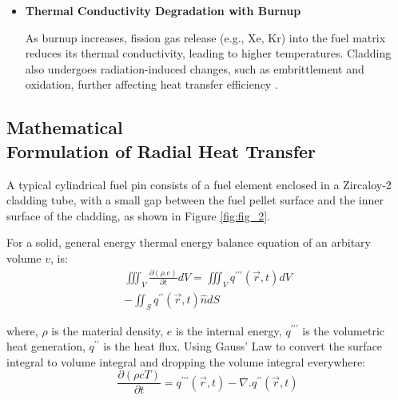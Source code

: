 \documentclass[12pt]{article}
\begin{document}
\begin{multicols}{2}
\begin{itemize}[leftmargin=0pt]
    \item[] \textbf{Thermal Conductivity Degradation with Burnup}

    As burnup increases, fission gas release (e.g., Xe, Kr) into the fuel matrix reduces its thermal conductivity, leading to higher temperatures. Cladding also undergoes radiation-induced changes, such as embrittlement and oxidation, further affecting heat transfer efficiency \cite{osti_1035151}.

\end{itemize}

\end{multicols}

\begin{multicols}{2}

\section{Mathematical \\ Formulation of Radial Heat Transfer}

A typical cylindrical fuel pin consists of a fuel element enclosed in a Zircaloy-2 cladding tube, with a small gap between the fuel pellet surface and the inner surface of the cladding, as shown in Figure \ref{fig:fig_2}.

For a solid, general energy thermal energy balance equation of an arbitary volume $v$, is:
\begin{equation}\label{eq:1}
    \begin{split}
            \iiint_V \frac{\partial(\rho.e)}{\partial t}dV = \iiint_V q^{\prime \prime \prime} \left({\vec{r}},t\right)d V \\ - \iint_S q^{\prime \prime} \left({\vec{r}},t\right) \hat{n}dS
    \end{split}
\end{equation}

where, $\rho$ is the material density, $e$ is the internal energy, $q^{\prime \prime \prime}$ is the volumetric heat generation, $q^{\prime \prime}$ is the heat flux. Using Gauss' Law to convert the surface integral to volume integral and dropping the volume integral everywhere: 
\begin{equation}\label{eq:2}
    \frac{\partial (\rho cT)}{\partial t} = q^{\prime \prime \prime} \left({\vec{r}},t\right) - \nabla . q^{\prime \prime}\left({\vec{r}},t\right)
\end{equation}


\end{multicols}
\end{document}
